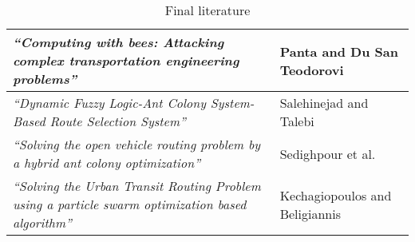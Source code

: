 \begin{table}[!htb]
{\begin{center}
\begin{tabular}[c]{| m{7cm} | m{7cm} |}
        \textit{``Computing with bees: Attacking complex transportation engineering problems''} & Panta and Du San Teodorovi \\ \hline
        \textit{``Dynamic Fuzzy Logic-Ant Colony System-Based Route Selection System''} & Salehinejad and Talebi \\ \hline
        \textit{``Solving the open vehicle routing problem by a hybrid ant colony optimization''} & Sedighpour et al. \\ \hline
        \textit{``Solving the Urban Transit Routing Problem using a particle swarm optimization based algorithm''} & Kechagiopoulos and Beligiannis \\ 
        \hline
    \end{tabular}
    \end{center}
    } 
\caption{Final literature}\label{table:finalliterature}
\end{table}